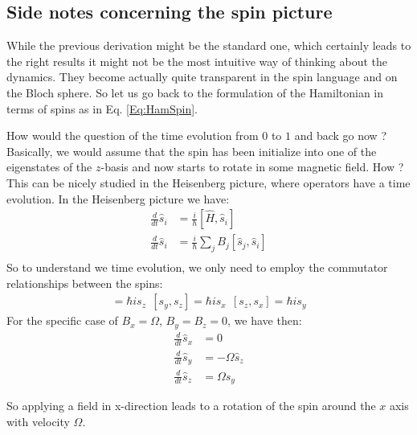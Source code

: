 \subsection{Side notes concerning the spin picture}

While the previous derivation might be the standard one, which certainly leads to the right results it might not be the most intuitive way of thinking about the dynamics. They become actually quite transparent in the spin language and on the Bloch sphere. So let us go back to the formulation of the Hamiltonian in terms of spins as in Eq. \eqref{Eq:HamSpin}.

How would the question of the time evolution from $0$ to $1$ and back go now ? Basically, we would assume that the spin has been initialize into one of the eigenstates of the $z$-basis and now starts to rotate in some magnetic field. How ? This can be nicely studied in the Heisenberg picture, where operators have a time evolution. In the Heisenberg picture we have:
\begin{align}
\frac{d}{dt} \hat{s}_i &= \frac{i}{\hbar}\left[\hat{H},\hat{s}_i\right]\\
\frac{d}{dt} \hat{s}_i &= \frac{i}{\hbar}\sum_j B_j \left[\hat{s}_j,\hat{s}_i\right]\\
 \end{align}
So to understand we time evolution, we only need to employ the commutator relationships between the spins:
\begin{align}
[ s_x, s_y] = \hbar is_z~~[ s_y, s_z] = \hbar is_x~~[ s_z, s_x] = \hbar is_y
\end{align}
For the specific case of $B_x=\Omega$, $B_y = B_z = 0$, we have then:
\begin{align}
\frac{d}{dt} \hat{s}_x &= 0\\
\frac{d}{dt} \hat{s}_y &= -\Omega \hat{s}_z\\
\frac{d}{dt} \hat{s}_z &= \Omega \hat{s}_y
 \end{align}
 
 So applying a field in x-direction leads to a rotation of the spin around the $x$ axis with velocity $\Omega$.